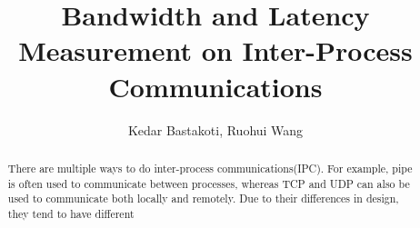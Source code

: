 \documentclass[10pt]{article}
\begin{document}
\title{Bandwidth and Latency Measurement on Inter-Process Communications}
\author{Kedar Bastakoti, Ruohui Wang}
\date{}

\maketitle

\begin{abstract}
    There are multiple ways to do inter-process communications(IPC). For example, pipe is often used to communicate between processes, whereas TCP and UDP can also be used to communicate both locally and remotely. Due to their differences in design, they tend to have different
\end{abstract}









    
\end{document}
